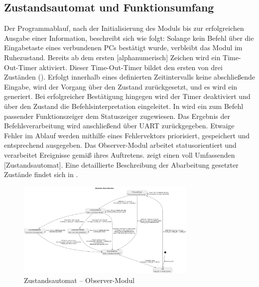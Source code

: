 \newpage
\subsection{Zustandsautomat und Funktionsumfang}
\label{sec:ZustaendeUndFunktionen}

Der Programmablauf, nach der Initialisierung des Moduls bis zur erfolgreichen Ausgabe einer Information, beschreibt sich wie folgt:
Solange kein Befehl \"uber die Eingabetaste eines verbundenen PCs best\"atigt wurde, verbleibt das Modul im Ruhezustand. Bereits ab dem ersten [alphanumerisch] Zeichen wird ein \glqq{}Time-Out-Timer\grqq{} aktiviert. Dieser Time-Out-Timer bildet den ersten von drei Zust\"anden (). Erfolgt innerhalb eines definierten Zeitintervalls keine abschlie{\ss}ende Eingabe, wird der Vorgang \"uber den Zustand  zur\"uckgesetzt, und es wird ein  generiert. Bei erfolgreicher Best\"atigung hingegen wird der Timer deaktiviert und \"uber den Zustand  die Befehlsinterpretation eingeleitet. In  wird ein zum Befehl passender Funktionszeiger dem Statuszeiger zugewiesen. Das Ergebnis der Befehlsverarbeitung wird anschlie{\ss}end \"uber UART zur\"uckgegeben. Etwaige Fehler im Ablauf werden mithilfe eines Fehlervektors priorisiert, gespeichert und entsprechend ausgegeben. Das Observer-Modul arbeitet statusorientiert und verarbeitet Ereignisse gem\"a{\ss} ihres Auftretens.  zeigt einen voll Umfassenden [Zustandsautomat].
Eine detaillierte Beschreibung der Abarbeitung gesetzter Zust\"ande findet sich in .

\newpage
\begin{figure}[h!]
	\centering
	\includegraphics[angle=270, width=0.77\textwidth]{../Bilder/observer_state_machine.png}
	\caption{Zustandsautomat -- Observer-Modul}
	\label{fig:StateMachine_ObserverModul}
\end{figure}

